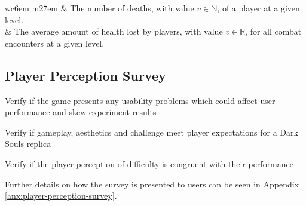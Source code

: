\begin{table}[!ht]
\begin{center}
\begin{tabular}{ w{c}{6em} m{27em} }
         & The number of deaths, with value $v \in \mathbb{N}$, of a player at a given level. \\
         & The average amount of health lost by players, with value $v \in \mathbb{R}$, for all combat encounters at a given level.  \\
        \bottomrule
      \end{tabular}
    \end{center}
\end{table}

\subsection{Player Perception Survey}


Verify if the game presents any usability problems which could affect user performance and skew experiment results

Verify if gameplay, aesthetics and challenge meet player expectations for a Dark Souls replica

Verify if the player perception of difficulty is congruent with their performance

Further details on how the survey is presented to users can be seen in Appendix \ref{anx:player-perception-survey}.

